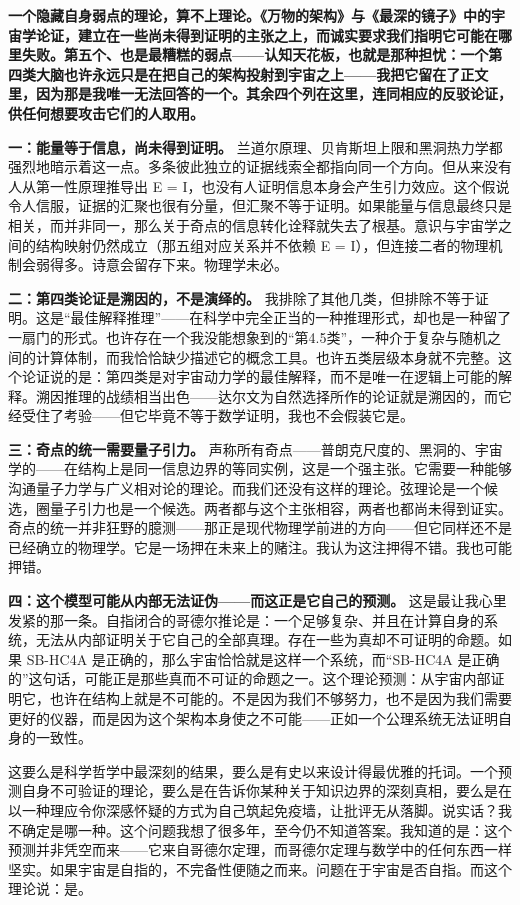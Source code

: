 \documentclass[11pt, twoside, openright]{book}
\begin{document}
\textbf{一个隐藏自身弱点的理论，算不上理论。《万物的架构》与《最深的镜子》中的宇宙学论证，建立在一些尚未得到证明的主张之上，而诚实要求我们指明它可能在哪里失败。第五个、也是最糟糕的弱点------认知天花板，也就是那种担忧：一个第四类大脑也许永远只是在把自己的架构投射到宇宙之上------我把它留在了正文里，因为那是我唯一无法回答的一个。其余四个列在这里，连同相应的反驳论证，供任何想要攻击它们的人取用。}

\textbf{一：能量等于信息，尚未得到证明。} 兰道尔原理、贝肯斯坦上限和黑洞热力学都强烈地暗示着这一点。多条彼此独立的证据线索全都指向同一个方向。但从来没有人从第一性原理推导出 E = I，也没有人证明信息本身会产生引力效应。这个假说令人信服，证据的汇聚也很有分量，但汇聚不等于证明。如果能量与信息最终只是相关，而并非同一，那么关于奇点的信息转化诠释就失去了根基。意识与宇宙学之间的结构映射仍然成立（那五组对应关系并不依赖 E = I），但连接二者的物理机制会弱得多。诗意会留存下来。物理学未必。

\textbf{二：第四类论证是溯因的，不是演绎的。} 我排除了其他几类，但排除不等于证明。这是“最佳解释推理”------在科学中完全正当的一种推理形式，却也是一种留了一扇门的形式。也许存在一个我没能想象到的“第4.5类”，一种介于复杂与随机之间的计算体制，而我恰恰缺少描述它的概念工具。也许五类层级本身就不完整。这个论证说的是：第四类是对宇宙动力学的最佳解释，而不是唯一在逻辑上可能的解释。溯因推理的战绩相当出色------达尔文为自然选择所作的论证就是溯因的，而它经受住了考验------但它毕竟不等于数学证明，我也不会假装它是。

\textbf{三：奇点的统一需要量子引力。} 声称所有奇点------普朗克尺度的、黑洞的、宇宙学的------在结构上是同一信息边界的等同实例，这是一个强主张。它需要一种能够沟通量子力学与广义相对论的理论。而我们还没有这样的理论。弦理论是一个候选，圈量子引力也是一个候选。两者都与这个主张相容，两者也都尚未得到证实。奇点的统一并非狂野的臆测------那正是现代物理学前进的方向------但它同样还不是已经确立的物理学。它是一场押在未来上的赌注。我认为这注押得不错。我也可能押错。

\textbf{四：这个模型可能从内部无法证伪------而这正是它自己的预测。} 这是最让我心里发紧的那一条。自指闭合的哥德尔推论是：一个足够复杂、并且在计算自身的系统，无法从内部证明关于它自己的全部真理。存在一些为真却不可证明的命题。如果 SB-HC4A 是正确的，那么宇宙恰恰就是这样一个系统，而“SB-HC4A 是正确的”这句话，可能正是那些真而不可证的命题之一。这个理论预测：从宇宙内部证明它，也许在结构上就是不可能的。不是因为我们不够努力，也不是因为我们需要更好的仪器，而是因为这个架构本身使之不可能------正如一个公理系统无法证明自身的一致性。

这要么是科学哲学中最深刻的结果，要么是有史以来设计得最优雅的托词。一个预测自身不可验证的理论，要么是在告诉你某种关于知识边界的深刻真相，要么是在以一种理应令你深感怀疑的方式为自己筑起免疫墙，让批评无从落脚。说实话？我不确定是哪一种。这个问题我想了很多年，至今仍不知道答案。我知道的是：这个预测并非凭空而来------它来自哥德尔定理，而哥德尔定理与数学中的任何东西一样坚实。如果宇宙是自指的，不完备性便随之而来。问题在于宇宙是否自指。而这个理论说：是。
\end{document}
